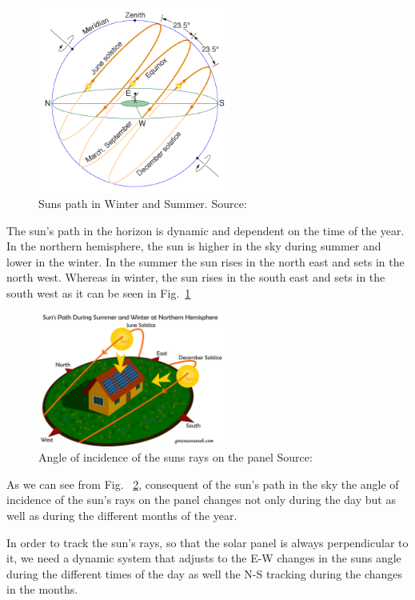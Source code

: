 \documentclass[conference]{IEEEtran}
\begin{document}
\begin{figure}[htbp]
	\includegraphics[width=2.5in]{img/SunsPath1.png}
	\centering
    \captionsetup{justification=centering}
	\caption{Suns path in Winter and Summer. Source: \cite{b1}}
	\label{fig:SunsPath1}
\end{figure}

The sun's path in the horizon is dynamic and dependent on the time of the year. In the northern hemisphere, the sun is higher in the sky during summer and lower in the winter. In the summer the sun rises in the north east and sets in the north west. Whereas in winter, the sun rises in the south east and sets in the south west as it can be seen in Fig.~\ref{fig:SunsPath1}

\begin{figure}[htbp]
    \includegraphics[width=2.5in]{img/SunsPath2.png}
    \centering
    \captionsetup{justification=centering}
    \caption{Angle of incidence of the suns rays on the panel Source: \cite{b2}}
    \label{fig:SunsPath2}
\end{figure}

\par\smallskip
As we can see from Fig. ~\ref{fig:SunsPath2}, consequent of the sun's path in the sky the angle of incidence of the sun's rays on the panel changes not only during the day but as well as during the different months of the year.

\par\smallskip
In order to track the sun's rays, so that the solar panel is always perpendicular to it, we need a dynamic system that adjusts to the E-W changes in the suns angle during the different times of the day as well the N-S tracking during the changes in the months.
\end{document}
